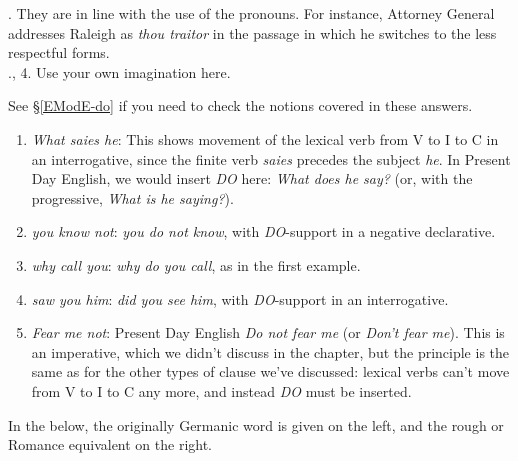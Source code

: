 . They are in line with the use of the pronouns. For instance, Attorney General addresses Raleigh as \textit{thou traitor} in the passage in which he switches to the less respectful forms.\\

., 4. Use your own imagination here.\\


\noindent\textbf{}

\noindent See §\ref{EModE-do} if you need to check the notions covered in these answers.

\begin{enumerate}
    \item \emph{What saies he}: This shows movement of the lexical verb from V to I to C in an interrogative, since the finite verb \emph{saies} precedes the subject \emph{he}. In Present Day English, we would insert \emph{DO} here: \emph{What does he say?} (or, with the progressive, \emph{What is he saying?}).
    \item \emph{you know not}: \emph{you do not know}, with \emph{DO}-support in a negative declarative.
    \item \emph{why call you}: \emph{why do you call}, as in the first example.
    \item \emph{saw you him}: \emph{did you see him}, with \emph{DO}-support in an interrogative.
    \item \emph{Fear me not}: Present Day English \emph{Do not fear me} (or \emph{Don't fear me}). This is an imperative, which we didn't discuss in the chapter, but the principle is the same as for the other types of clause we've discussed: lexical verbs can't move from V to I to C any more, and instead \emph{DO} must be inserted.
\end{enumerate}

\noindent\textbf{}

\noindent In the below, the originally Germanic word is given on the left, and the rough  or Romance equivalent on the right.

